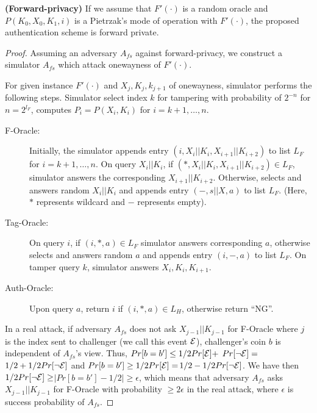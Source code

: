 \documentclass[english]{llncs}
\begin{document}
\begin{theorem}
\textbf{(Forward-privacy)} If we assume that $F'(\cdot)$ is a random
oracle and $P(K_{0},X_{0},K_{1},i)$ is a Pietrzak's mode of operation with $F'(\cdot)$,
 the proposed authentication scheme
is forward private. 
\end{theorem}
\begin{proof}
Assuming an adversary $A_{fs}$ against forward-privacy, we construct a simulator 
$A_{fs}$ which attack onewayness
of $F'(\cdot)$.

For given instance $F'(\cdot)$ and $X_j, K_j, k_{j+1}$ of onewayness, simulator performs the following steps.
Simulator select index $k$ for tampering with probability of $2^{-n}$ for $n = 2^{l_F}$, computes 
$P_i = P(X_i, K_i)$
for 
$i = k+1, \ldots, n$.

\begin{description}
\item[F-Oracle:] 
Initially, the simulator appends entry 
$(i, X_i || K_i , X_{i+1} || K_{i+2})$
to list $L_F$ for $i = k+1, \ldots, n$.
On query $X_i || K_i$, if $(*, X_i || K_i, X_{i+1} || K_{i+2}) \in L_F$,
simulator answers the corresponding $X_{i+1} || K_{i+2}$.
Otherwise, selects and answers random $X_i || K_i$ and appends entry $(-, s||X, a)$ to list $L_F$.
(Here, $*$ represents wildcard and $-$ represents empty).
  
\item[Tag-Oracle:] 
On query $i$, if $(i, *, a) \in L_F$ simulator answers corresponding $a$, otherwise selects and answers 
random $a$ and appends entry $(i, - , a)$ to list $L_F$.
On tamper query $k$, simulator answers $X_i, K_i, K_{i+1}$.


\item[Auth-Oracle:] 
Upon query $a$, return $i$ if $(i, *,a) \in L_H$, otherwise return ``NG''.
\end{description}

In a real attack, if adversary $A_{fs}$ does not ask $X_{j-1} || K_{j-1}$ for F-Oracle where $j$ is the index sent to
challenger (we call this event $\cal{E}$), challenger's coin $b$ is independent of $A_{fs}$'s view.
Thus, $Pr[b = b'] \le 1/2 Pr[\cal{E}]+$ $Pr [\neg \cal{E}] =$ $1/2 + 1/2Pr[\neg \cal{E}]$
and $Pr[b=b'] \ge 1/2Pr[\cal{E}] =$$1/2-1/2Pr[\neg \cal{E}]$.
We have then $1/2Pr[\neg \cal{E}] \ge $$|Pr[b= b'] -1/2| \ge \epsilon$, which means 
that adversary $A_{fs}$ asks $X_{j-1}||K_{j-1}$ for F-Oracle with probability $\ge 2\epsilon$ in the
real attack, where $\epsilon$ is success probability of $A_{fs}$.


\end{proof}
\end{document}
